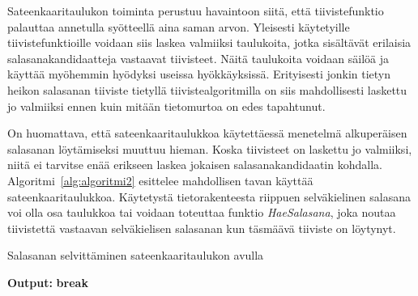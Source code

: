 Sateenkaaritaulukon toiminta perustuu havaintoon siitä, että tiivistefunktio palauttaa annetulla syötteellä aina saman arvon. Yleisesti käytetyille tiivistefunktioille voidaan siis laskea valmiiksi taulukoita, jotka sisältävät erilaisia salasanakandidaatteja vastaavat tiivisteet. Näitä taulukoita voidaan säilöä ja käyttää myöhemmin hyödyksi useissa hyökkäyksissä. Erityisesti jonkin tietyn heikon salasanan tiiviste tietyllä tiivistealgoritmilla on siis mahdollisesti laskettu jo valmiiksi ennen kuin mitään tietomurtoa on edes tapahtunut.

On huomattava, että sateenkaaritaulukkoa käytettäessä menetelmä alkuperäisen salasanan löytämiseksi muuttuu hieman. Koska tiivisteet on laskettu jo valmiiksi, niitä ei tarvitse enää erikseen laskea jokaisen salasanakandidaatin kohdalla. Algoritmi~\ref{alg:algoritmi2} esittelee mahdollisen tavan käyttää sateenkaaritaulukkoa. Käytetystä tietorakenteesta riippuen selväkielinen salasana voi olla osa taulukkoa tai voidaan toteuttaa funktio \textit{HaeSalasana}, joka noutaa tiivistettä vastaavan selväkielisen salasanan kun täsmäävä tiiviste on löytynyt.

\begin{algorithm}
    \caption{Salasanan selvittäminen sateenkaaritaulukon avulla\label{alg:algoritmi2}}
    \begin{algorithmic}[1]
                    \State \textbf{Output:} 
                    \State \textbf{break}
                \EndIf
            \EndFor
        \EndProcedure
    \end{algorithmic}
\end{algorithm}
